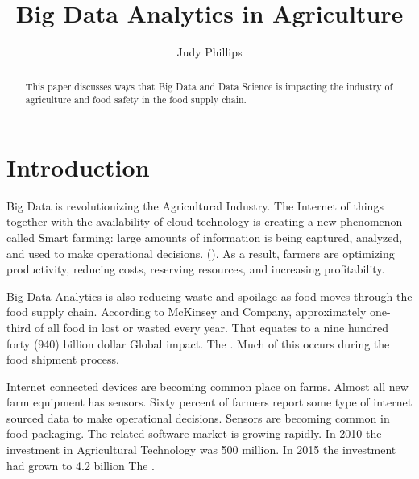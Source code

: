 \documentclass[sigconf]{acmart}
\begin{document}
\title{Big Data Analytics in Agriculture}


\author{Judy Phillips}

\renewcommand{\shortauthors}{B. Trovato et al.}


\begin{abstract}
This paper discusses ways that Big Data and Data Science is impacting the industry of agriculture and food safety in the food supply chain.
\end{abstract}



\maketitle

\section{Introduction}

Big Data is revolutionizing the Agricultural Industry. The Internet of things together with the availability of cloud technology is creating a new phenomenon called Smart farming: large amounts of information is being captured, analyzed, and used to make operational decisions.  (\cite{book}). As a result, farmers are optimizing productivity, reducing costs, reserving resources, and increasing profitability. 

Big Data Analytics is also reducing waste and spoilage as food moves through the food supply chain.  According to McKinsey and Company,  approximately one-third of all food in lost or wasted every year. That equates to a nine hundred forty (940) billion dollar Global impact. The \cite{www-google}. Much of this occurs during the food shipment process.  

Internet connected devices are becoming common place on farms. Almost all new farm equipment has sensors. Sixty percent of farmers report some type of internet sourced data to make operational decisions. Sensors are becoming common in food packaging. The related software market is growing rapidly. In 2010 the investment in Agricultural Technology was 500 million. In 2015 the investment had grown to 4.2 billion The \cite{book}. 
\end{document}
